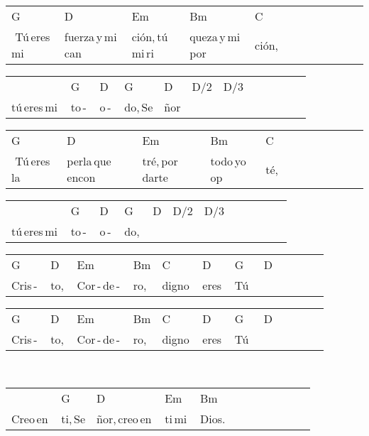 \hfill
\begin{multicols}{2}
\noindent
\begin{minipage}{\columnwidth}
\noindent
\noindent
\begin{tabular}{llllllllllll}
G&D&Em&Bm&C\\
\,\,Tú\,eres\,mi\,&fuerza\,y\,mi\,can&ción,\,tú\,mi\,ri&queza\,y\,mi\,por&ción,
\end{tabular}

\noindent
\begin{tabular}{llllllllllll}
&G&D&G&D&D{/}2&D{/}3\\
tú\,eres\,mi\,&to\,-\,&o\,-\,&do,\,Se&ñor\qquad&\,\qquad\,&
\end{tabular}

\noindent
\begin{tabular}{llllllllllll}
G&D&Em&Bm&C\\
\,\,Tú\,eres\,la\,&perla\,que\,encon&tré,\,por\,darte\,&todo\,yo\,op&té,
\end{tabular}

\noindent
\begin{tabular}{llllllllllll}
&G&D&G&D&D{/}2&D{/}3\\
tú\,eres\,mi\,&to\,-\,&o\,-\,&do,\,&\,\qquad\,&\,\qquad\,&
\end{tabular}

\noindent
\begin{tabular}{llllllllllll}
G&D&Em&Bm&C&D&G&D\\
Cris\,-\,&to,\,&Cor\,-\,de\,-\,&ro,\,\quad\,&digno\,&eres\,&Tú\,\,&
\end{tabular}

\noindent
\begin{tabular}{llllllllllll}
G&D&Em&Bm&C&D&G&D\\
Cris\,-\,&to,\,&Cor\,-\,de\,-\,&ro,\,\quad\,&digno\,&eres\,&Tú\,\,&
\end{tabular}
\end{minipage}\\

\noindent
\begin{minipage}{\columnwidth}
\noindent
\noindent
\begin{tabular}{llllllllllll}
&G&D&Em&Bm\\
Creo\,en\,&ti,\,Se&ñor,\,creo\,en\,&ti\,mi\,&Dios.
\end{tabular}


\end{minipage}
\end{multicols}

